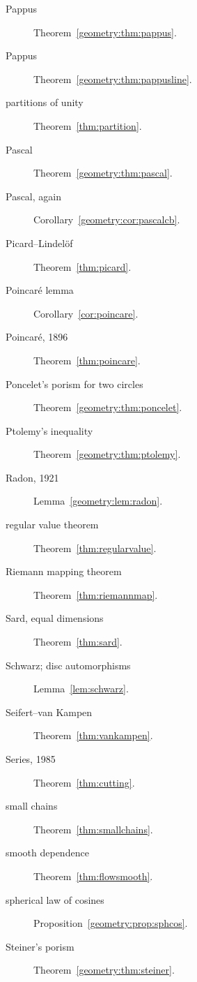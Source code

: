 \begin{description}
\item[Pappus] Theorem~\ref{geometry:thm:pappus}.
\item[Pappus] Theorem~\ref{geometry:thm:pappusline}.
\item[partitions of unity] Theorem~\ref{thm:partition}.
\item[Pascal] Theorem~\ref{geometry:thm:pascal}.
\item[Pascal, again] Corollary~\ref{geometry:cor:pascalcb}.
\item[Picard--Lindel\"of] Theorem~\ref{thm:picard}.
\item[Poincar\'e lemma] Corollary~\ref{cor:poincare}.
\item[Poincaré, 1896] Theorem~\ref{thm:poincare}.
\item[Poncelet's porism for two circles] Theorem~\ref{geometry:thm:poncelet}.
\item[Ptolemy's inequality] Theorem~\ref{geometry:thm:ptolemy}.
\item[Radon, 1921] Lemma~\ref{geometry:lem:radon}.
\item[regular value theorem] Theorem~\ref{thm:regularvalue}.
\item[Riemann mapping theorem] Theorem~\ref{thm:riemannmap}.
\item[Sard, equal dimensions] Theorem~\ref{thm:sard}.
\item[Schwarz; disc automorphisms] Lemma~\ref{lem:schwarz}.
\item[Seifert--van Kampen] Theorem~\ref{thm:vankampen}.
\item[Series, 1985] Theorem~\ref{thm:cutting}.
\item[small chains] Theorem~\ref{thm:smallchains}.
\item[smooth dependence] Theorem~\ref{thm:flowsmooth}.
\item[spherical law of cosines] Proposition~\ref{geometry:prop:sphcos}.
\item[Steiner's porism] Theorem~\ref{geometry:thm:steiner}.

\end{description}
